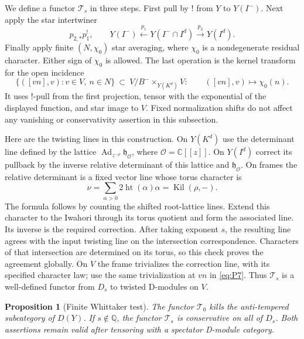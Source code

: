 \documentclass[11pt]{article}
\numberwithin{equation}{section}
\newtheorem{proposition}[theorem]{Proposition}
\theoremstyle{definition}
\theoremstyle{remark}
\begin{document}
We define a functor $\mathcal T_s$ in three steps.  First pull by $!$ from
$Y$ to $Y(I^-)$.  Next apply the star intertwiner
\[
 p_{2,*}p_1^!,\qquad
 Y(I^-)\xleftarrow{\ p_1\ }Y(I^-\cap I^d)
             \xrightarrow{\ p_2\ }Y(I^d).
\]
Finally apply finite $(N,\chi_0)$ star averaging, where $\chi_0$ is a
nondegenerate residual character.  Either sign of $\chi_0$ is allowed.
The last operation is the kernel transform for the open incidence
\begin{equation}
 \{([vn],v):v\in V,\ n\in N\}
 \ \subset\ V/B^-\mathbin{\times}_{Y(K^d)}V:
 \qquad ([vn],v)\longmapsto \chi_0(n).
 \label{eq:P7}
\end{equation}
It uses $!$-pull from the first projection, tensor with the exponential of
the displayed function, and star image to $V$.  Fixed normalization shifts
do not affect any vanishing or conservativity assertion in this
subsection.

Here are the twisting lines in this construction.  On $Y(K^d)$ use the
determinant line defined by the lattice
$\operatorname{Ad}_{z^{-\rho}}\mathfrak h_{\mathcal O}$, where
$\mathcal O=\mathbb C[[z]]$.  On $Y(I^d)$ correct its pullback by the
inverse relative determinant of this lattice and
$\mathfrak h_{\mathcal O}$.  On frames the relative determinant is a fixed
vector line whose torus character is
\begin{equation}
 \nu=\sum_{\alpha>0}2\operatorname{ht}(\alpha)\alpha
       =\operatorname{Kil}(\rho,-).
 \label{planch:det-character}
\end{equation}
The formula follows by counting the shifted root-lattice lines.  Extend
this character to the Iwahori through its torus quotient and form the
associated line.  Its inverse is the required correction.  After taking
exponent $s$, the resulting line agrees with the input twisting line on
the intersection correspondence.  Characters of that intersection are
determined on its torus, so this check proves the agreement globally.
On $V$ the frame trivializes the correction line, with its specified
character law; use the same trivialization at $vn$ in \eqref{eq:P7}.
Thus $\mathcal T_s$ is a well-defined functor from $D_s$ to twisted
D-modules on $V$.

\begin{proposition}[Finite Whittaker test]
\label{planch:finite-test}
The functor $\mathcal T_0$ kills the anti-tempered subcategory of $D(Y)$.
If $s\notin\mathbb Q$, the functor $\mathcal T_s$ is conservative on all
of $D_s$.  Both assertions remain valid after tensoring with a spectator
D-module category.
\end{proposition}
\end{document}
